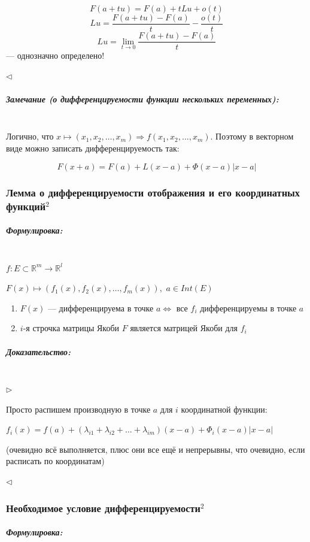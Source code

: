\documentclass{article}
\def\dbl{\,\,}
\let\vanillasubparagraph\subparagraph
\renewcommand{\subparagraph}[1]{\vanillasubparagraph{#1}\mbox{}\\}
\begin{document}
\[F(a + tu) = F(a) + tLu + o(t)\]
\[Lu = \frac{F(a + tu) - F(a)}{t} - \frac{o(t)}{t}\]
\[Lu = \lim_{t \rightarrow 0}{\frac{F(a + tu) - F(a)}{t}}\] --- однозначно определено!

$\lhd$

\subparagraph{Замечание (о дифференцируемости функции нескольких переменных): }

Логично, что $x \mapsto (x_1, x_2, \ldots, x_m) \Rightarrow f(x_1, x_2, \ldots, x_m)$. Поэтому в векторном виде можно записать дифференцируемость так:

\[F(x + a) = F(a) + L(x - a) + \Phi(x - a)|x - a|\]

\subsubsection{Лемма о дифференцируемости отображения и его координатных функций\texorpdfstring{$^2$}{}}

\subparagraph{Формулировка: }

$f: E \subset \mathbb{R}^m \rightarrow \mathbb{R}^l$

$F(x) \mapsto (f_1(x), f_2(x), \ldots, f_m(x)), \dbl a \in Int(E)$

\begin{enumerate}
    \item $F(x)$ --- дифференцируема в точке $a \Leftrightarrow$ все $f_i$ дифференцируемы в точке $a$
    
    \item $i$-я строчка матрицы Якоби $F$ является матрицей Якоби для $f_i$
\end{enumerate}

\subparagraph{Доказательство: }

$\rhd$

Просто распишем производную в точке $a$ для $i$ координатной функции:

$f_i(x) = f(a) + (\lambda_{i1} + \lambda_{i2} + \ldots + \lambda_{im}) (x - a) + \Phi_i(x - a)|x - a|$


(очевидно всё выполняется, плюс они все ещё и непрерывны, что очевидно, если расписать по координатам)

$\lhd$

\subsubsection{Необходимое условие дифференцируемости\texorpdfstring{$^2$}{}}

\subparagraph{Формулировка: }
\end{document}
